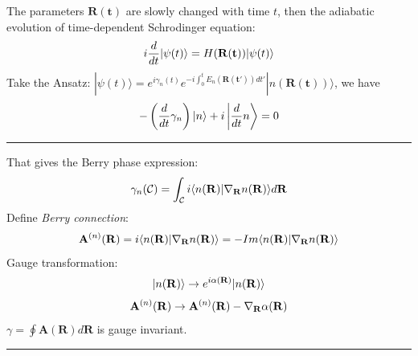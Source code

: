 \documentclass[letterpaper,10pt,english]{sphinxmanual}
\begin{document}
The parameters \(\mathbf{R(t)}\) are slowly changed with time \(t\),
then the adiabatic evolution of time-dependent Schrodinger equation:
\begin{gather}
\begin{split}i\frac{d}{dt}|\psi(t)\rangle=H(\mathbf{R(t)})|\psi(t)\rangle\end{split}\notag
\end{gather}
Take the
Ansatz:  \(|\psi(t)\rangle=e^{i\gamma_n(t)}e^{-i\int_0^tE_n(\mathbf{R(t')})dt'}|n(\mathbf{R(t)})\rangle\),
we have
\begin{gather}
\begin{split}-\left(\frac{d}{dt}\gamma_n\right)|n\rangle+i\left|\frac{d}{dt}n\right\rangle=0\end{split}\notag
\end{gather}

\bigskip\hrule{}\bigskip


That gives the Berry phase expression:
\begin{gather}
\begin{split}\gamma_n(\mathcal{C})=\int_\mathcal{C}i\langle n(\mathbf{R})|\nabla_{\mathbf{R}}n(\mathbf{R})\rangle d\mathbf{R}\end{split}\notag
\end{gather}
Define \emph{Berry connection}:
\begin{gather}
\begin{split}\mathbf{A}^{(n)}(\mathbf{R})=i\langle n(\mathbf{R})|\nabla_{\mathbf{R}}n(\mathbf{R})\rangle=-Im\langle n(\mathbf{R})|\nabla_{\mathbf{R}}n(\mathbf{R})\rangle\end{split}\notag
\end{gather}
Gauge transformation:
\begin{gather}
\begin{split}|n(\mathbf{R})\rangle \to e^{i\alpha(\mathbf{R})}|n(\mathbf{R})\rangle\end{split}\notag
\end{gather}\begin{gather}
\begin{split}\mathbf{A}^{(n)}(\mathbf{R}) \to \mathbf{A}^{(n)}(\mathbf{R})-\nabla_{\mathbf{R}}\alpha(\mathbf{R})\end{split}\notag
\end{gather}
\(\gamma=\oint\mathbf{A}(\mathbf{R})d\mathbf{R}\) is gauge invariant.


\bigskip\hrule{}\bigskip
\end{document}
